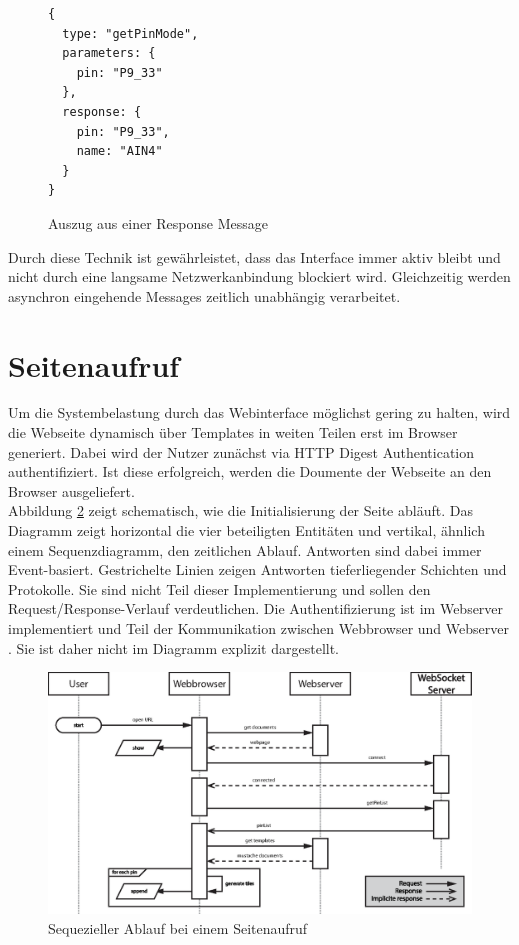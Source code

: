 \begin{figure}[ht]
\begin{lstlisting}
{
  type: "getPinMode",
  parameters: {
    pin: "P9_33"
  },
  response: {
    pin: "P9_33",
    name: "AIN4"
  }
}
\end{lstlisting}
\caption{Auszug aus einer Response Message}
\label{lst:responseMessage}
\end{figure}

Durch diese Technik ist gewährleistet, dass das Interface immer aktiv bleibt und nicht durch eine langsame Netzwerkanbindung blockiert wird. Gleichzeitig werden asynchron eingehende Messages zeitlich unabhängig verarbeitet.

\section{Seitenaufruf}
Um die Systembelastung durch das Webinterface möglichst gering zu halten, wird die Webseite dynamisch über Templates in weiten Teilen erst im Browser generiert. Dabei wird der Nutzer zunächst via HTTP Digest Authentication authentifiziert. Ist diese erfolgreich, werden die Doumente der Webseite an den Browser ausgeliefert.\\

Abbildung \ref{fig:pageloadSequence} zeigt schematisch, wie die Initialisierung der Seite abläuft. Das Diagramm zeigt horizontal die vier beteiligten Entitäten und vertikal, ähnlich einem Sequenzdiagramm, den zeitlichen Ablauf. Antworten sind dabei immer Event-basiert. Gestrichelte Linien zeigen Antworten tieferliegender Schichten und Protokolle. Sie sind nicht Teil dieser Implementierung und sollen den Request/Response-Verlauf verdeutlichen. Die Authentifizierung ist im Webserver implementiert und Teil der Kommunikation zwischen Webbrowser und Webserver \cite{rfc7235}. Sie ist daher nicht im Diagramm explizit dargestellt.

\begin{figure}[ht]
\centering
\includegraphics[width = \textwidth]{documentation/images/pageload.eps}
\caption{Sequezieller Ablauf bei einem Seitenaufruf}
\label{fig:pageloadSequence}
\end{figure}


